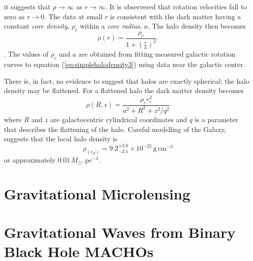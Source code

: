 it suggests that $\rho \rightarrow \infty$ as $r \rightarrow \infty$. It is
observered that rotation velocities fall to zero as $r\rightarrow 0$. The data
at small $r$ is consistent with the dark matter having a constant \emph{core
density}, $\rho_c$ within a \emph{core radius}, $a$. The halo density then
becomes
\begin{equation}
\rho(r) = \frac{\rho_c}{1 + \left(\frac{r}{a}\right)^2}.
\label{eq:simplehalodensity3}
\end{equation}.
The values of $\rho_c$ and $a$ are obtained from fitting measured galactic
rotation curves to equation (\ref{eq:simplehalodensity3}) using data near the
galactic center. 

There is, in fact, no evidence to suggest that halos are
exactly spherical; the halo density may be flattened\cite{Rix:1996}. For a
flattened halo the dark matter density becomes
\begin{equation}
\rho(R,z) = \frac{\rho_c r^2_c}{a^2 + R^2 + z^2/q^2}
\label{eq:simplehalodensity4}
\end{equation}
where $R$ and $z$ are galactocentric cylindrical coordinates and $q$ is a
parameter that describes the flattening of the halo. Careful modelling of the
Galaxy\cite{1995ApJ...449L.123G}, suggests that the local halo density is
\begin{equation}
\rho_(r_E) = 9.2_{-3.1}^{+3.8} \times 10^{-25}\, \mathrm{g}\,\mathrm{cm}^{-3}
\end{equation}
or approximately $0.01\,M_\odot.\,\mathrm{pc}^{-3}$.

\section{Gravitational Microlensing}
\label{s:microlensing}


\section{Gravitational Waves from Binary Black Hole MACHOs}
\label{s:bbhmacho}


